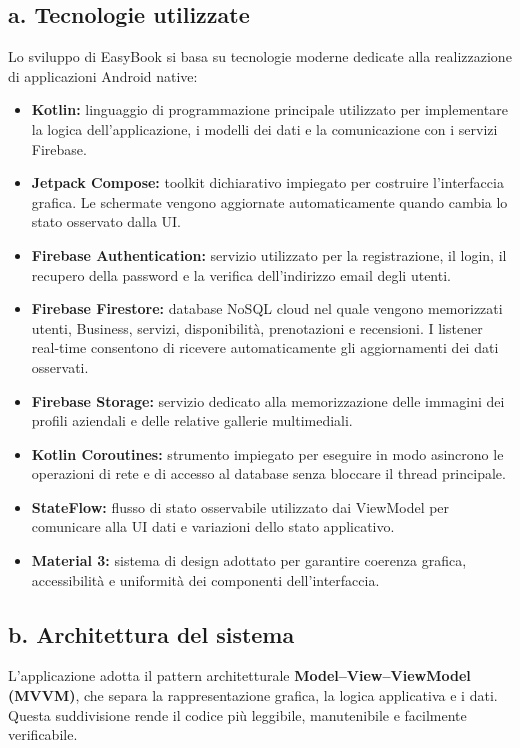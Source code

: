 \documentclass[12pt]{article}
\begin{document}
\subsection{a. Tecnologie utilizzate}
Lo sviluppo di EasyBook si basa su tecnologie moderne dedicate alla realizzazione di applicazioni Android native:
\begin{itemize}
    \item \textbf{Kotlin:} linguaggio di programmazione principale utilizzato per implementare la logica dell'applicazione, i modelli dei dati e la comunicazione con i servizi Firebase.
    \item \textbf{Jetpack Compose:} toolkit dichiarativo impiegato per costruire l'interfaccia grafica. Le schermate vengono aggiornate automaticamente quando cambia lo stato osservato dalla UI.
    \item \textbf{Firebase Authentication:} servizio utilizzato per la registrazione, il login, il recupero della password e la verifica dell'indirizzo email degli utenti.
    \item \textbf{Firebase Firestore:} database NoSQL cloud nel quale vengono memorizzati utenti, Business, servizi, disponibilità, prenotazioni e recensioni. I listener real-time consentono di ricevere automaticamente gli aggiornamenti dei dati osservati.
    \item \textbf{Firebase Storage:} servizio dedicato alla memorizzazione delle immagini dei profili aziendali e delle relative gallerie multimediali.
    \item \textbf{Kotlin Coroutines:} strumento impiegato per eseguire in modo asincrono le operazioni di rete e di accesso al database senza bloccare il thread principale.
    \item \textbf{StateFlow:} flusso di stato osservabile utilizzato dai ViewModel per comunicare alla UI dati e variazioni dello stato applicativo.
    \item \textbf{Material 3:} sistema di design adottato per garantire coerenza grafica, accessibilità e uniformità dei componenti dell'interfaccia.
\end{itemize}

\subsection{b. Architettura del sistema}
L'applicazione adotta il pattern architetturale \textbf{Model--View--ViewModel (MVVM)}, che separa la rappresentazione grafica, la logica applicativa e i dati. Questa suddivisione rende il codice più leggibile, manutenibile e facilmente verificabile.
\end{document}
